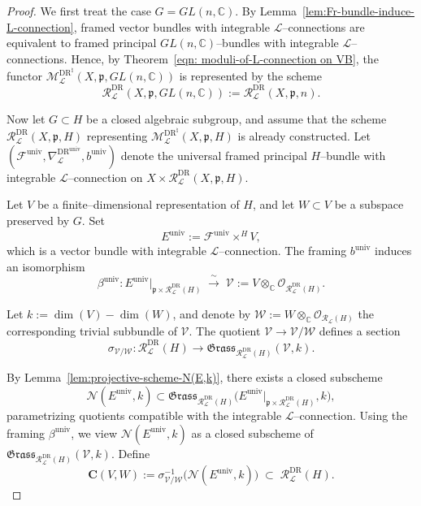 \documentclass[10pt,a4paper]{amsart}
\begin{document}
\begin{proof}
	We first treat the case $G = GL(n,\mathbb{C})$.
	By Lemma~\eqref{lem:Fr-bundle-induce-L-connection}, framed vector bundles with integrable $\mathcal{L}$--connections are equivalent to  framed principal $GL(n,\mathbb{C})$--bundles with integrable $\mathcal{L}$--connections. Hence, by Theorem~\eqref{eqn: moduli-of-L-connection on VB}, the functor
	$\mathcal{M}^{\text{DR}^{\natural}}_{\mathcal{L}}(X,\mathfrak{p},GL(n,\mathbb{C}))$ is represented by the scheme
	\[
	\mathcal{R}^{\text{DR}}_{\mathcal{L}}(X,\mathfrak{p},GL(n,\mathbb{C}))
	:= \mathcal{R}^{\text{DR}}_{\mathcal{L}}(X,\mathfrak{p},n).
	\]
	
	Now let $G \subset H$ be a closed algebraic subgroup, and assume that the scheme $\mathcal{R}^{\text{DR}}_{\mathcal{L}}(X,\mathfrak{p},H)$ representing
	$\mathcal{M}^{\text{DR}^{\natural}}_{\mathcal{L}}(X,\mathfrak{p},H)$ is already constructed.
	Let $
	(\mathcal{F}^{\mathrm{univ}}, \nabla^{\text{DR}^{\mathrm{univ}}}_{\mathcal{L}},b^{\mathrm{univ}})
	$
	denote the universal framed principal $H$--bundle with integrable
	$\mathcal{L}$--connection on
	$X \times \mathcal{R}^{\text{DR}}_{\mathcal{L}}(X,\mathfrak{p},H)$.
	
	Let $V$ be a finite--dimensional representation of $H$, and let
	$W \subset V$ be a subspace preserved by $G$.
	Set
	\[
	E^{\mathrm{univ}} := \mathcal{F}^{\mathrm{univ}} \times^{H} V,
	\]
	which is a vector bundle with integrable $\mathcal{L}$--connection.
	The framing $b^{\mathrm{univ}}$ induces an isomorphism
	\[
	\beta^{\mathrm{univ}} :
	E^{\mathrm{univ}}|_{\mathfrak{p} \times \mathcal{R}^{\text{DR}}_{\mathcal{L}}(H)}
	\;\xrightarrow{\;\sim\;}\;
	\mathcal{V} := V \otimes_{\mathbb{C}}
	\mathcal{O}_{\mathcal{R}^{\text{DR}}_{\mathcal{L}}(H)}.
	\]
	
	Let $k := \dim(V) - \dim(W)$, and denote by
	$\mathcal{W} := W \otimes_{\mathbb{C}}
	\mathcal{O}_{\mathcal{R}_{\mathcal{L}}(H)}$
	the corresponding trivial subbundle of $\mathcal{V}$.
	The quotient $\mathcal{V} \to \mathcal{V}/\mathcal{W}$ defines a section
	\[
	\sigma_{\mathcal{V}/\mathcal{W}} :
	\mathcal{R}^{\text{DR}}_{\mathcal{L}}(H)
	\longrightarrow
	\mathfrak{Grass}_{\mathcal{R}^{\text{DR}}_{\mathcal{L}}(H)}(\mathcal{V},k).
	\]
	
	By Lemma~\eqref{lem:projective-scheme-N(E,k)}, there exists a
	closed subscheme
	\[
	\mathcal{N}(E^{\mathrm{univ}},k)
	\subset
	\mathfrak{Grass}_{\mathcal{R}^{\text{DR}}_{\mathcal{L}}(H)}
	\bigl(E^{\mathrm{univ}}|_{\mathfrak{p}\times
		\mathcal{R}^{\text{DR}}_{\mathcal{L}}(H)}, k\bigr),
	\]
	parametrizing quotients compatible with the integrable
	$\mathcal{L}$--connection.
	Using the framing $\beta^{\mathrm{univ}}$, we view
	$\mathcal{N}(E^{\mathrm{univ}},k)$ as a closed subscheme of
	$\mathfrak{Grass}_{\mathcal{R}^{\text{DR}}_{\mathcal{L}}(H)}(\mathcal{V},k)$.
	Define
	\[
	\mathbf{C}(V,W)
	:=
	\sigma_{\mathcal{V}/\mathcal{W}}^{-1}
	\bigl(\mathcal{N}(E^{\mathrm{univ}},k)\bigr)
	\;\subset\;
	\mathcal{R}^{\text{DR}}_{\mathcal{L}}(H).
	\]
	

\end{proof}
\end{document}
